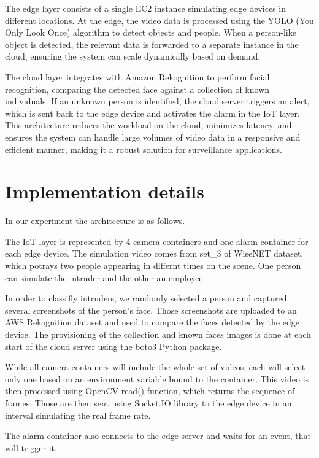 \documentclass[conference]{IEEEtran}
\begin{document}
The edge layer consists of a single EC2 instance simulating edge devices in different locations. At the edge, the video data is processed using the YOLO (You Only Look Once) algorithm to detect objects and people. When a person-like object is detected, the relevant data is forwarded to a separate instance in the cloud, ensuring the system can scale dynamically based on demand.

The cloud layer integrates with Amazon Rekognition to perform facial recognition, comparing the detected face against a collection of known individuals. If an unknown person is identified, the cloud server triggers an alert, which is sent back to the edge device and activates the alarm in the IoT layer. This architecture reduces the workload on the cloud, minimizes latency, and ensures the system can handle large volumes of video data in a responsive and efficient manner, making it a robust solution for surveillance applications.



\section{Implementation details}
In our experiment the architecture is as follows.

The IoT layer is represented by 4 camera containers and one alarm container for each edge device. The simulation video comes from set\_3 of WiseNET dataset, which potrays two people appearing in differnt times on the scene. One person can simulate the intruder and the other an employee. 

In order to classifiy intruders, we randomly selected a person and captured several screenshots of the person's face. Those screenshots are uploaded to an AWS Rekognition dataset and used to compare the faces detected by the edge device. The provisioning of the collection and known faces images is done at each start of the cloud server using the boto3 Python package.


While all camera containers will include the whole set of videos, each will select only one based on an environment variable bound to the container. This video is then processed using OpenCV read() function, which returns the sequence of frames. Those are then sent using Socket.IO library to the edge device in an interval simulating the real frame rate. 

The alarm container also connects to the edge server and waits for an event, that will trigger it.
\end{document}
